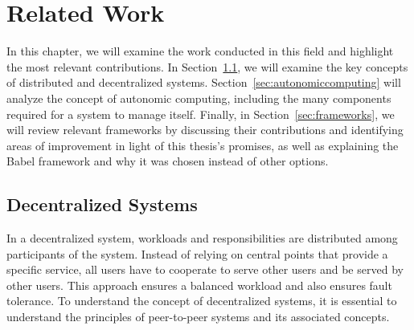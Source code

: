 
%

\chapter{Related Work}
\label{cha:relatedwork}


\epigraphfontsize{\small\itshape}
\setlength\epigraphwidth{12.5cm}
\setlength\epigraphrule{0pt}

\par In this chapter, we will examine the work conducted in this field and highlight the most relevant contributions. In Section~\ref{sec:decentralized_systems}, we will examine the key concepts of distributed and decentralized systems. Section~\ref{sec:autonomiccomputing} will analyze the concept of autonomic computing, including the many components required for a system to manage itself. Finally, in Section~\ref{sec:frameworks}, we will review relevant frameworks by discussing their contributions and identifying areas of improvement in light of this thesis's promises, as well as explaining the Babel framework and why it was chosen instead of other options.
%                                                            
\section{Decentralized Systems}
\label{sec:decentralized_systems}
\par In a decentralized system,  workloads and responsibilities are distributed among participants of the system. Instead of relying on central points that provide a specific service, all users have to cooperate to serve other users and be served by other users. This approach ensures a balanced workload and also ensures fault tolerance. To understand the concept of decentralized systems, it is essential to understand the principles of peer-to-peer systems and its associated concepts.
